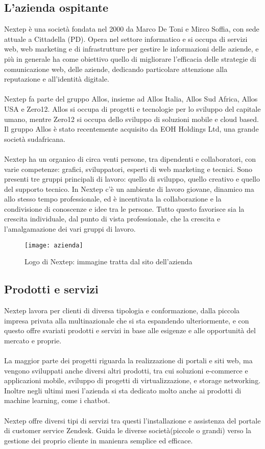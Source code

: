 \subsection{L'azienda ospitante}
Nextep è una società fondata nel 2000 da Marco De Toni e Mirco Soffia, con sede
attuale a Cittadella (PD).
Opera nel settore informatico e si occupa di servizi web, web marketing e di infrastrutture
per gestire le informazioni delle aziende, e più in generale ha come obiettivo
quello di migliorare l’efficacia delle strategie di comunicazione web, delle aziende,
dedicando particolare attenzione alla reputazione e all’identità digitale. \\ \\
Nextep fa parte del gruppo Allos, insieme ad Allos Italia, Allos Sud Africa, Allos
USA e Zero12.
Allos si occupa di progetti e tecnologie per lo sviluppo del capitale umano, mentre
Zero12 si occupa dello sviluppo di soluzioni mobile e cloud based.
Il gruppo Allos è stato recentemente acquisito da EOH Holdings Ltd, una grande
società sudafricana.\\ \\
Nextep ha un organico di circa venti persone, tra dipendenti e collaboratori, con
varie competenze: grafici, sviluppatori, esperti di web marketing e tecnici. Sono presenti
tre gruppi principali di lavoro: quello di sviluppo, quello creativo e quello del supporto
tecnico.
In Nextep c’è un ambiente di lavoro giovane, dinamico ma allo stesso tempo professionale,
ed è incentivata la collaborazione e la condivisione di conoscenze e idee
tra le persone. Tutto questo favorisce sia la crescita individuale, dal punto di vista
professionale, che la crescita e l’amalgamazione dei vari gruppi di lavoro.
\begin{figure}[!h] 
	\centering 
	\texttt{[image: azienda]} 
	\caption{Logo di Nextep: immagine tratta dal sito dell’azienda}
\end{figure}
\subsection{Prodotti e servizi}
Nextep lavora per clienti di diversa tipologia e conformazione, dalla piccola impresa
privata alla multinazionale che si sta espandendo ulteriormente, e con questo offre
svariati prodotti e servizi in base alle esigenze e alle opportunità del mercato e proprie. 
\\ \\La maggior parte dei progetti riguarda la realizzazione di portali e siti web, ma vengono
sviluppati anche diversi altri prodotti, tra cui soluzioni e-commerce e applicazioni
mobile, sviluppo di progetti di virtualizzazione, e storage networking. Inoltre negli ultimi mesi l'azienda si sta dedicato molto anche ai prodotti di machine learning, come i chatbot. \\ \\Nextep offre diversi tipi di servizi tra questi l'installazione e assistenza del portale di customer service Zendesk. Guida le diverse società(piccole o grandi) verso la gestione dei proprio cliente in manienra semplice ed efficace. 

